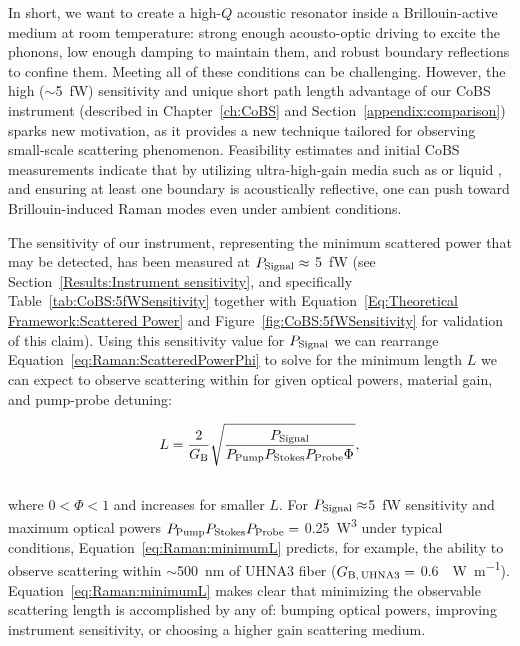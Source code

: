 In short, we want to create a high-\(Q\) acoustic resonator inside a Brillouin-active medium at room temperature: strong enough acousto-optic driving to excite the phonons, low enough damping to maintain them, and robust boundary reflections to confine them. Meeting all of these conditions can be challenging. However, the high (\(\sim\)\SI{5}{\femto\watt}) sensitivity and unique short path length advantage of our \ac{CoBS} instrument (described in Chapter~\ref{ch:CoBS} and Section~\ref{appendix:comparison}) sparks new motivation, as it provides a new technique tailored for observing small-scale scattering phenomenon. Feasibility estimates and initial \ac{CoBS} measurements indicate that by utilizing ultra-high-gain media such as  \cite{sanghera2010nonlinear, abedin2005observation} or liquid  \cite{boyd2020nonlinear}, and ensuring at least one boundary is acoustically reflective, one can push toward Brillouin-induced Raman modes even under ambient conditions.

The sensitivity of our instrument, representing the minimum scattered power that may be detected, has been measured at \(P_{\rm Signal}\approx\) \SI{5}{\femto\watt} (see Section~\ref{Results:Instrument sensitivity}, and specifically Table~\ref{tab:CoBS:5fWSensitivity} together with Equation~\ref{Eq:Theoretical Framework:Scattered Power} and Figure~\ref{fig:CoBS:5fWSensitivity} for validation of this claim). Using this sensitivity value for \(P_{\rm Signal}\) we can rearrange Equation~\ref{eq:Raman:ScatteredPowerPhi} to solve for the minimum length \(L\) we can expect to observe scattering within for given optical powers, material gain, and pump-probe detuning:

\begin{equation}
  L = \frac{2}{G_{\rm B}}\sqrt{\frac{P_{\rm Signal}}{P_{\rm Pump}P_{\rm Stokes}P_{\rm Probe}\Phi}},
  \label{eq:Raman:minimumL}
\end{equation}
\\
where \(0 < \Phi < 1\) and increases for smaller \(L\). For \(P_{\rm Signal}\approx\)\SI{5}{\femto\watt} sensitivity and maximum optical powers \(P_{\rm Pump}P_{\rm Stokes}P_{\rm Probe}=\) \SI{0.25}{\cubic\watt} under typical conditions, Equation~\ref{eq:Raman:minimumL} predicts, for example, the ability to observe scattering within \(\sim\)\SI{500}{\nano\meter} of \ac{UHNA3} fiber (\(G_{\rm B,\,UHNA3}=\) \SI{0.6}{\per\watt\per\meter}). Equation~\ref{eq:Raman:minimumL} makes clear that minimizing the observable scattering length is accomplished by any of: bumping optical powers, improving instrument sensitivity, or choosing a higher gain scattering medium.

